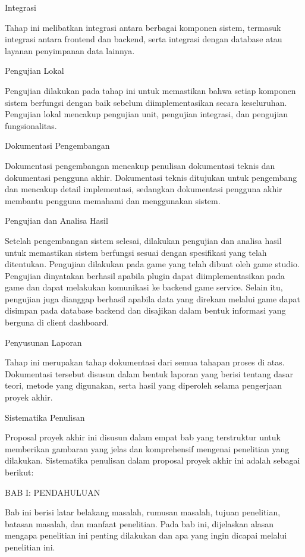 Integrasi

Tahap ini melibatkan integrasi antara berbagai komponen sistem, termasuk integrasi antara frontend dan backend, serta integrasi dengan database atau layanan penyimpanan data lainnya.

Pengujian Lokal

Pengujian dilakukan pada tahap ini untuk memastikan bahwa setiap komponen sistem berfungsi dengan baik sebelum diimplementasikan secara keseluruhan. Pengujian lokal mencakup pengujian unit, pengujian integrasi, dan pengujian fungsionalitas.

Dokumentasi Pengembangan

Dokumentasi pengembangan mencakup penulisan dokumentasi teknis dan dokumentasi pengguna akhir. Dokumentasi teknis ditujukan untuk pengembang dan mencakup detail implementasi, sedangkan dokumentasi pengguna akhir membantu pengguna memahami dan menggunakan sistem.

Pengujian dan Analisa Hasil

Setelah pengembangan sistem selesai, dilakukan pengujian dan analisa hasil untuk memastikan sistem berfungsi sesuai dengan spesifikasi yang telah ditentukan. Pengujian dilakukan pada game yang telah dibuat oleh game studio. Pengujian dinyatakan berhasil apabila plugin dapat diimplementasikan pada game dan dapat melakukan komunikasi ke backend game service. Selain itu, pengujian juga dianggap berhasil apabila data yang direkam melalui game dapat disimpan pada database backend dan disajikan dalam bentuk informasi yang berguna di client dashboard.

Penyusunan Laporan

Tahap ini merupakan tahap dokumentasi dari semua tahapan proses di atas. Dokumentasi tersebut disusun dalam bentuk laporan yang berisi tentang dasar teori, metode yang digunakan, serta hasil yang diperoleh selama pengerjaan proyek akhir.

Sistematika Penulisan

Proposal proyek akhir ini disusun dalam empat bab yang terstruktur untuk memberikan gambaran yang jelas dan komprehensif mengenai penelitian yang dilakukan. Sistematika penulisan dalam proposal proyek akhir ini adalah sebagai berikut:

BAB I: PENDAHULUAN

Bab ini berisi latar belakang masalah, rumusan masalah, tujuan penelitian, batasan masalah, dan manfaat penelitian. Pada bab ini, dijelaskan alasan mengapa penelitian ini penting dilakukan dan apa yang ingin dicapai melalui penelitian ini.

